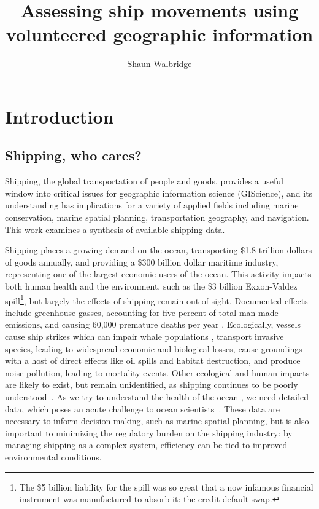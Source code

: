 \documentclass[12pt,letterpaper]{article}
\begin{document}
\title{\Huge{Assessing ship movements using volunteered geographic information}}
\author{Shaun Walbridge}
\maketitle{}

\section{\textbf{Introduction}}


\subsection{Shipping, who cares?}
Shipping, the global transportation of people and goods, provides a useful window into critical issues for geographic information science (GIScience), and its understanding has implications for a variety of applied fields including marine conservation, marine spatial planning, transportation geography, and navigation.  This work examines a synthesis of available shipping data.

Shipping places a growing demand on the ocean, transporting \$1.8 trillion dollars of goods annually, %
and providing a \$300 billion dollar maritime industry, representing one of the largest economic users of the ocean. This activity impacts both human health and the environment, such as the \$3 billion Exxon-Valdez spill\footnote{The \$5 billion liability for the spill was so great that a now infamous financial instrument was manufactured to absorb it: the credit default swap.}, but largely the effects of shipping remain out of sight. Documented effects include greenhouse gasses, accounting for five percent of total man-made emissions, and causing 60,000 premature deaths per year \citep{Corbett2007}. Ecologically, vessels cause ship strikes which can impair whale populations \citep{Fujiwara2001}, %
 transport invasive species, leading to widespread economic and biological losses, cause groundings with a host of direct effects like oil spills and habitat destruction, and produce noise pollution, leading to mortality events. Other ecological and human impacts are likely to exist, but remain unidentified, as shipping continues to be poorly understood~\citep{Davenport2006}. As we try to understand the health of the ocean \citep{Halpern2012}, we need detailed data, which poses an acute challenge to ocean scientists~\citep{Wright1997}. These data are necessary to inform decision-making, such as marine spatial planning, but is also important to minimizing the regulatory burden on the shipping industry: by managing shipping as a complex system, efficiency can be tied to improved environmental conditions.
\end{document}

